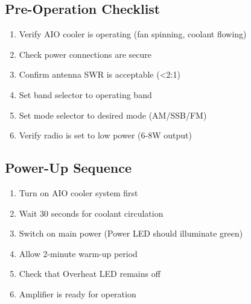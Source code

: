 \documentclass[11pt,a4paper]{article}
\begin{document}
\begin{center}
\end{center}

\subsection{Pre-Operation Checklist}
\begin{enumerate}
    \item Verify AIO cooler is operating (fan spinning, coolant flowing)
    \item Check power connections are secure
    \item Confirm antenna SWR is acceptable (<2:1)
    \item Set band selector to operating band
    \item Set mode selector to desired mode (AM/SSB/FM)
    \item Verify radio is set to low power (6-8W output)
\end{enumerate}

\subsection{Power-Up Sequence}
\begin{enumerate}
    \item Turn on AIO cooler system first
    \item Wait 30 seconds for coolant circulation
    \item Switch on main power (Power LED should illuminate green)
    \item Allow 2-minute warm-up period
    \item Check that Overheat LED remains off
    \item Amplifier is ready for operation
\end{enumerate}
\end{document}
